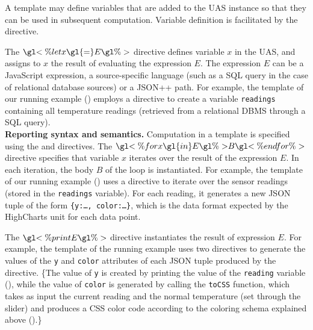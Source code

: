  A template may define variables that are added to the UAS instance so that they can be used in subsequent computation. Variable definition is facilitated by the  directive.

The $\gl{<\% let } x \gl{ = } E \gl{ \%>}$ directive defines variable $x$ in the UAS, and assigns to
$x$ the result of evaluating the expression $E$. The expression $E$ can be a JavaScript expression, a source-specific language (such as a SQL query in the case of relational database sources) or a JSON++ path. For example, the template of our running example () employs a  directive to create a variable \texttt{readings} containing all temperature readings (retrieved from a relational DBMS through a SQL query).\\

{\bf Reporting syntax and semantics.} Computation in a template is specified using the  and  directives.
The $\gl{<\% for } x \gl{ in } E \gl{ \%> } B \gl{ <\% end for \%>}$ directive specifies that variable $x$ iterates over the result of the expression $E$. In each iteration, the body $B$ of the  loop is instantiated. For example, the template of our running example () uses a  directive to iterate over the sensor readings (stored in the \texttt{readings} variable). For each reading, it generates a new JSON tuple of the form \texttt{\{y:\ldots, color:\ldots\}}, which is the data format expected by the HighCharts unit for each data point. 


The $\gl{<\% print } E \gl{ \%>}$ directive instantiates the result of expression $E$. For example, the template of the running example uses two  directives to generate the values of the \texttt{y} and \texttt{color} attributes of each JSON tuple produced by the  directive. \{The value of \texttt{y} is created by printing the value of the \texttt{reading} variable (), while the value of \texttt{color} is generated by calling the \texttt{toCSS} function, which takes as input the current reading and the normal temperature (set through the slider) and produces a CSS color code according to the coloring schema explained above ().\}\\


